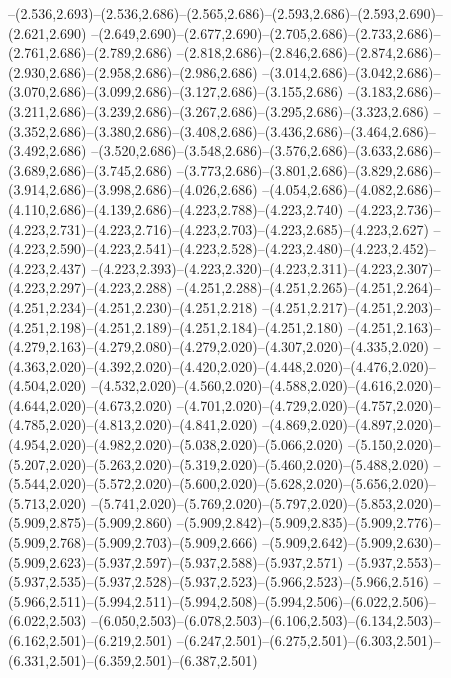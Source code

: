   --(2.536,2.693)--(2.536,2.686)--(2.565,2.686)--(2.593,2.686)--(2.593,2.690)--(2.621,2.690)%
  --(2.649,2.690)--(2.677,2.690)--(2.705,2.686)--(2.733,2.686)--(2.761,2.686)--(2.789,2.686)%
  --(2.818,2.686)--(2.846,2.686)--(2.874,2.686)--(2.930,2.686)--(2.958,2.686)--(2.986,2.686)%
  --(3.014,2.686)--(3.042,2.686)--(3.070,2.686)--(3.099,2.686)--(3.127,2.686)--(3.155,2.686)%
  --(3.183,2.686)--(3.211,2.686)--(3.239,2.686)--(3.267,2.686)--(3.295,2.686)--(3.323,2.686)%
  --(3.352,2.686)--(3.380,2.686)--(3.408,2.686)--(3.436,2.686)--(3.464,2.686)--(3.492,2.686)%
  --(3.520,2.686)--(3.548,2.686)--(3.576,2.686)--(3.633,2.686)--(3.689,2.686)--(3.745,2.686)%
  --(3.773,2.686)--(3.801,2.686)--(3.829,2.686)--(3.914,2.686)--(3.998,2.686)--(4.026,2.686)%
  --(4.054,2.686)--(4.082,2.686)--(4.110,2.686)--(4.139,2.686)--(4.223,2.788)--(4.223,2.740)%
  --(4.223,2.736)--(4.223,2.731)--(4.223,2.716)--(4.223,2.703)--(4.223,2.685)--(4.223,2.627)%
  --(4.223,2.590)--(4.223,2.541)--(4.223,2.528)--(4.223,2.480)--(4.223,2.452)--(4.223,2.437)%
  --(4.223,2.393)--(4.223,2.320)--(4.223,2.311)--(4.223,2.307)--(4.223,2.297)--(4.223,2.288)%
  --(4.251,2.288)--(4.251,2.265)--(4.251,2.264)--(4.251,2.234)--(4.251,2.230)--(4.251,2.218)%
  --(4.251,2.217)--(4.251,2.203)--(4.251,2.198)--(4.251,2.189)--(4.251,2.184)--(4.251,2.180)%
  --(4.251,2.163)--(4.279,2.163)--(4.279,2.080)--(4.279,2.020)--(4.307,2.020)--(4.335,2.020)%
  --(4.363,2.020)--(4.392,2.020)--(4.420,2.020)--(4.448,2.020)--(4.476,2.020)--(4.504,2.020)%
  --(4.532,2.020)--(4.560,2.020)--(4.588,2.020)--(4.616,2.020)--(4.644,2.020)--(4.673,2.020)%
  --(4.701,2.020)--(4.729,2.020)--(4.757,2.020)--(4.785,2.020)--(4.813,2.020)--(4.841,2.020)%
  --(4.869,2.020)--(4.897,2.020)--(4.954,2.020)--(4.982,2.020)--(5.038,2.020)--(5.066,2.020)%
  --(5.150,2.020)--(5.207,2.020)--(5.263,2.020)--(5.319,2.020)--(5.460,2.020)--(5.488,2.020)%
  --(5.544,2.020)--(5.572,2.020)--(5.600,2.020)--(5.628,2.020)--(5.656,2.020)--(5.713,2.020)%
  --(5.741,2.020)--(5.769,2.020)--(5.797,2.020)--(5.853,2.020)--(5.909,2.875)--(5.909,2.860)%
  --(5.909,2.842)--(5.909,2.835)--(5.909,2.776)--(5.909,2.768)--(5.909,2.703)--(5.909,2.666)%
  --(5.909,2.642)--(5.909,2.630)--(5.909,2.623)--(5.937,2.597)--(5.937,2.588)--(5.937,2.571)%
  --(5.937,2.553)--(5.937,2.535)--(5.937,2.528)--(5.937,2.523)--(5.966,2.523)--(5.966,2.516)%
  --(5.966,2.511)--(5.994,2.511)--(5.994,2.508)--(5.994,2.506)--(6.022,2.506)--(6.022,2.503)%
  --(6.050,2.503)--(6.078,2.503)--(6.106,2.503)--(6.134,2.503)--(6.162,2.501)--(6.219,2.501)%
  --(6.247,2.501)--(6.275,2.501)--(6.303,2.501)--(6.331,2.501)--(6.359,2.501)--(6.387,2.501)%
